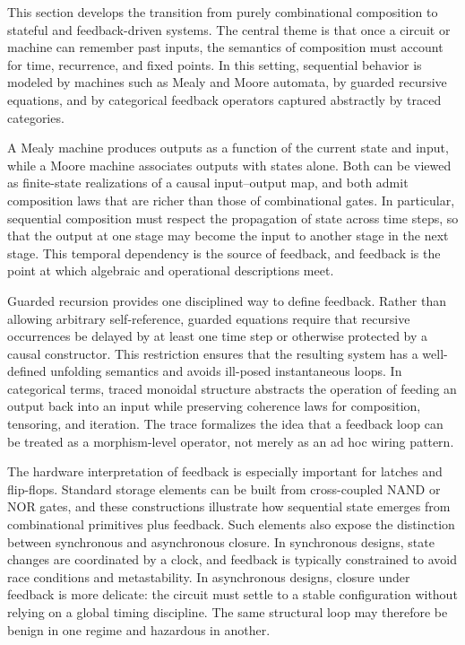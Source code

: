 This section develops the transition from purely combinational composition to stateful and feedback-driven systems. The central theme is that once a circuit or machine can remember past inputs, the semantics of composition must account for time, recurrence, and fixed points. In this setting, sequential behavior is modeled by machines such as Mealy and Moore automata, by guarded recursive equations, and by categorical feedback operators captured abstractly by traced categories.

A Mealy machine produces outputs as a function of the current state and input, while a Moore machine associates outputs with states alone. Both can be viewed as finite-state realizations of a causal input--output map, and both admit composition laws that are richer than those of combinational gates. In particular, sequential composition must respect the propagation of state across time steps, so that the output at one stage may become the input to another stage in the next stage. This temporal dependency is the source of feedback, and feedback is the point at which algebraic and operational descriptions meet.

Guarded recursion provides one disciplined way to define feedback. Rather than allowing arbitrary self-reference, guarded equations require that recursive occurrences be delayed by at least one time step or otherwise protected by a causal constructor. This restriction ensures that the resulting system has a well-defined unfolding semantics and avoids ill-posed instantaneous loops. In categorical terms, traced monoidal structure abstracts the operation of feeding an output back into an input while preserving coherence laws for composition, tensoring, and iteration. The trace formalizes the idea that a feedback loop can be treated as a morphism-level operator, not merely as an ad hoc wiring pattern.

The hardware interpretation of feedback is especially important for latches and flip-flops. Standard storage elements can be built from cross-coupled NAND or NOR gates, and these constructions illustrate how sequential state emerges from combinational primitives plus feedback. Such elements also expose the distinction between synchronous and asynchronous closure. In synchronous designs, state changes are coordinated by a clock, and feedback is typically constrained to avoid race conditions and metastability. In asynchronous designs, closure under feedback is more delicate: the circuit must settle to a stable configuration without relying on a global timing discipline. The same structural loop may therefore be benign in one regime and hazardous in another.

